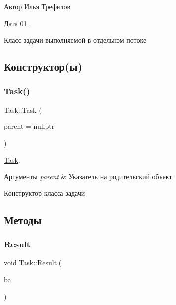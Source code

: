 \begin{DoxyAuthor}{Автор}
Илья Трефилов 
\end{DoxyAuthor}
\begin{DoxyDate}{Дата}
01..
\end{DoxyDate}
Класс задачи выполняемой в отдельном потоке 

\subsection{Конструктор(ы)}
\mbox{\label{classTask_a14c504e1e0ecef1a22429d6bf80771ac}} 
\subsubsection{\texorpdfstring{Task()}{Task()}}
{\footnotesize\ttfamily Task\+::\+Task (\begin{DoxyParamCaption}\item[{Q\+Object $\ast$}]{parent = {\ttfamily nullptr} }\end{DoxyParamCaption})}



\hyperlink{classTask}{Task}. 


\begin{DoxyParams}{Аргументы}
{\em parent} & Указатель на родительский объект\\
\hline
\end{DoxyParams}
Конструктор класса задачи 

\subsection{Методы}
\mbox{\label{classTask_a9a38657c8c17d817273b70166f35f8e2}} 
\subsubsection{\texorpdfstring{Result}{Result}}
{\footnotesize\ttfamily void Task\+::\+Result (\begin{DoxyParamCaption}\item[{Q\+Byte\+Array}]{ba }\end{DoxyParamCaption})\hspace{0.3cm}{\ttfamily [signal]}}



